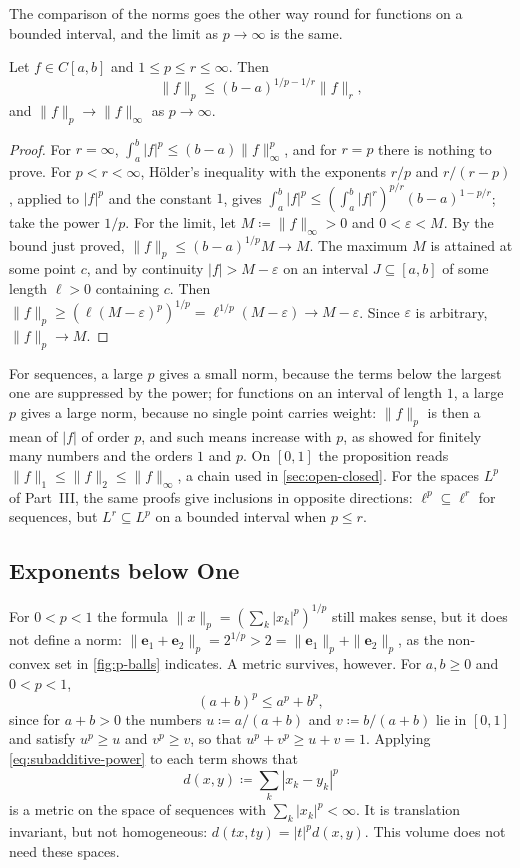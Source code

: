 The comparison of the norms goes the other way round for functions on a bounded interval, and the limit as $p\to\infty$ is the same.

\begin{proposition}
\label{prop:function-p-norms}
Let $f\in C[a,b]$ and $1\le p\le r\le\infty$. Then
\[
\|f\|_p\le(b-a)^{1/p-1/r}\|f\|_r ,
\]
and $\|f\|_p\to\|f\|_\infty$ as $p\to\infty$.
\end{proposition}

\begin{proof}
For $r=\infty$, $\int_a^b|f|^p\le(b-a)\|f\|_\infty^p$, and for $r=p$ there is nothing to prove. For $p<r<\infty$, H\"older's inequality with the exponents $r/p$ and $r/(r-p)$, applied to $|f|^p$ and the constant $1$, gives $\int_a^b|f|^p\le(\int_a^b|f|^r)^{p/r}(b-a)^{1-p/r}$; take the power $1/p$. For the limit, let $M\coloneqq\|f\|_\infty>0$ and $0<\varepsilon<M$. By the bound just proved, $\|f\|_p\le(b-a)^{1/p}M\to M$. The maximum $M$ is attained at some point $c$, and by continuity $|f|>M-\varepsilon$ on an interval $J\subseteq[a,b]$ of some length $\ell>0$ containing $c$. Then $\|f\|_p\ge(\ell(M-\varepsilon)^p)^{1/p}=\ell^{1/p}(M-\varepsilon)\to M-\varepsilon$. Since $\varepsilon$ is arbitrary, $\|f\|_p\to M$.
\end{proof}

For sequences, a large $p$ gives a small norm, because the terms below the largest one are suppressed by the power; for functions on an interval of length $1$, a large $p$ gives a large norm, because no single point carries weight: $\|f\|_p$ is then a mean of $|f|$ of order $p$, and such means increase with $p$, as  showed for finitely many numbers and the orders $1$ and $p$. On $[0,1]$ the proposition reads $\|f\|_1\le\|f\|_2\le\|f\|_\infty$, a chain used in \cref{sec:open-closed}. For the spaces $L^p$ of Part~III, the same proofs give inclusions in opposite directions: $\ell^p\subseteq\ell^r$ for sequences, but $L^r\subseteq L^p$ on a bounded interval when $p\le r$.

\subsection{Exponents below One}

For $0<p<1$ the formula $\|x\|_p=(\sum_k|x_k|^p)^{1/p}$ still makes sense, but it does not define a norm: $\|\mathbf e_1+\mathbf e_2\|_p=2^{1/p}>2=\|\mathbf e_1\|_p+\|\mathbf e_2\|_p$, as the non-convex set in \cref{fig:p-balls} indicates. A metric survives, however. For $a,b\ge0$ and $0<p<1$,
\begin{equation}
(a+b)^p\le a^p+b^p ,
\label{eq:subadditive-power}
\end{equation}
since for $a+b>0$ the numbers $u\coloneqq a/(a+b)$ and $v\coloneqq b/(a+b)$ lie in $[0,1]$ and satisfy $u^p\ge u$ and $v^p\ge v$, so that $u^p+v^p\ge u+v=1$. Applying \eqref{eq:subadditive-power} to each term shows that
\[
d(x,y)\coloneqq\sum_k|x_k-y_k|^p
\]
is a metric on the space of sequences with $\sum_k|x_k|^p<\infty$. It is translation invariant, but not homogeneous: $d(tx,ty)=|t|^pd(x,y)$. This volume does not need these spaces.

